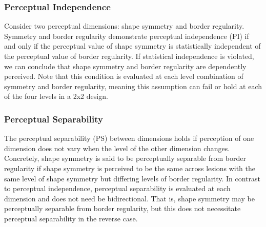 \documentclass[man, 12pt, a4paper,  donotrepeattitle, floatsintext, draftfirst]{apa7}
\begin{document}
\subsubsection{Perceptual Independence}
Consider two perceptual dimensions:
shape symmetry and
border regularity.
Symmetry and border regularity demonstrate perceptual independence (PI) if and only if the perceptual value of shape symmetry is statistically independent of the perceptual value of border regularity.
If statistical independence is violated, we can conclude that shape symmetry and border regularity are dependently perceived.
Note that this condition is evaluated at each level combination of symmetry and border regularity, meaning this assumption can fail or hold at each of the four levels in a 2x2 design.


\subsubsection{Perceptual Separability}
The perceptual separability (PS) between dimensions holds if perception of one dimension does not vary when the level of the other dimension changes.
Concretely, shape symmetry is said to be perceptually separable from border regularity if shape symmetry is perceived to be the same across lesions with the same level of shape symmetry but differing levels of border regularity.
In contrast to perceptual independence, perceptual separability is evaluated at each dimension and does not need be bidirectional.
That is, shape symmetry may be perceptually separable from border regularity, but this does not necessitate perceptual separability in the reverse case.
\end{document}
